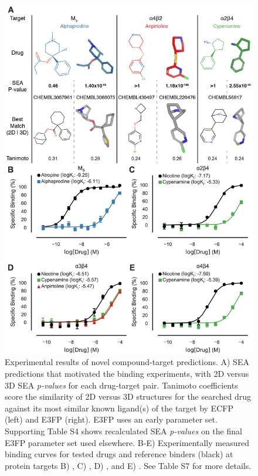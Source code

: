 \documentclass[../../main.tex]{subfiles}
\begin{document}
\begin{refsection}
	\begin{figure}%
		\centering  \includegraphics[width=12.5cm]{fig4.png}
		\caption[Experimental results of novel compound-target predictions]{
			Experimental results of novel compound-target predictions.
			A) SEA predictions that motivated the binding experiments, with 2D versus 3D SEA \emph{p-values} for each drug-target pair.
			Tanimoto coefficients score the similarity of 2D versus 3D structures for the searched drug against its most similar known ligand(s) of the target by ECFP (left) and E3FP (right).
			E3FP uses an early parameter set.
			Supporting Table S4 shows recalculated SEA \emph{p-values} on the final E3FP parameter set used elsewhere.
			B-E) Experimentally measured binding curves for tested drugs and reference binders (black) at protein targets B) , C) , D) , and E) .
			See Table S7 for more details.}
		\label{fig:fig4}
	\end{figure}


\end{refsection}
\end{document}
